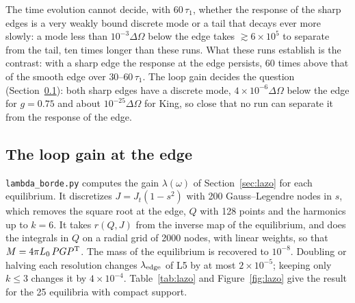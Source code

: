 \documentclass[11pt,a4paper]{article}
\begin{document}
The time evolution cannot decide, with $60\,\tau_1$, whether the response of the sharp edges is a
very weakly bound discrete mode or a tail that decays ever more slowly: a mode less than
$10^{-3}\Delta\Omega$ below the edge takes $\gtrsim6\times10^5$ to separate from the tail, ten times longer
than these runs. What these runs establish is the contrast: with a sharp edge the response
at the edge persists, 60 times above that of the smooth edge over $30$--$60\,\tau_1$. The loop
gain decides the question (Section~\ref{sec:res_lazo}): both sharp edges have a discrete mode,
$4\times10^{-6}\Delta\Omega$ below the edge for $g=0.75$ and about $10^{-25}\Delta\Omega$ for King, so close that
no run can separate it from the response of the edge.

\subsection{The loop gain at the edge}
\label{sec:res_lazo}

\texttt{lambda\_\allowbreak borde.py} computes the gain $\lambda(\omega)$ of Section~\ref{sec:lazo} for each
equilibrium. It discretizes $J=J_t(1-s^2)$ with 200 Gauss--Legendre nodes in $s$, which removes
the square root at the edge, $Q$ with 128 points and the harmonics up to $k=6$. It takes
$r(Q,J)$ from the inverse map of the equilibrium, and does the integrals in $Q$ on a radial
grid of 2000 nodes, with linear weights, so that $M=4\pi L_0\,PGP^{\rm T}$. The mass of the
equilibrium is recovered to $10^{-8}$. Doubling or halving each resolution changes
$\lambda_{\rm edge}$ of L5 by at most $2\times10^{-5}$; keeping only $k\le3$ changes it by $4\times10^{-4}$.
Table~\ref{tab:lazo} and Figure~\ref{fig:lazo} give the result for the 25 equilibria with
compact support.
\end{document}
